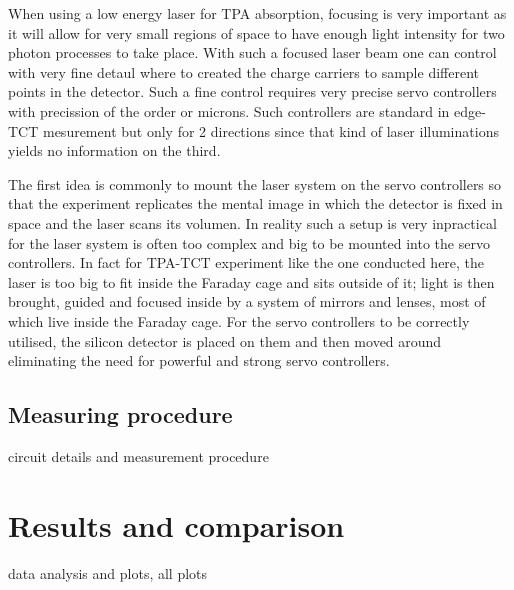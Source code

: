 When using a low energy laser for TPA absorption, focusing is very important as it will allow for very small regions of space to have enough light intensity for two photon processes to take place. With such a focused laser beam one can control with very fine detaul where to created the charge carriers to sample different points in the detector. Such a fine control requires very precise servo controllers with precission of the order or microns. Such controllers are standard in edge-TCT mesurement but only for 2 directions since that kind of laser illuminations yields no information on the third.

The first idea is commonly to mount the laser system on the servo controllers so that the experiment replicates the mental image in which the detector is fixed in space and the laser scans its volumen. In reality such a setup is very inpractical for the laser system is often too complex and big to be mounted into the servo controllers. In fact for TPA-TCT experiment like the one conducted here, the laser is too big to fit inside the Faraday cage and sits outside of it; light is then brought, guided and focused inside by a system of mirrors and lenses, most of which live inside the Faraday cage. For the servo controllers to be correctly utilised, the silicon detector is placed on them and then moved around eliminating the need for powerful and strong servo controllers.

\subsection{Measuring procedure} 

circuit details and measurement procedure


\section{Results and comparison} %
\label{sec:future_projection}

data analysis and plots, all plots 



